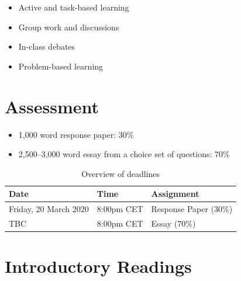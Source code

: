 \documentclass[abstract=on,parskip=full,headings=standardclasses,fontsize=11pt,paper=a4]{scrartcl}
\begin{document}
\begin{itemize}
\item Active and task-based learning
\item Group work and discussions
\item In-class debates
\item Problem-based learning
\end{itemize}

\section*{Assessment}

\begin{itemize}
\item 1,000 word response paper: 30\% 
\item 2,500--3,000 word essay from a choice set of questions: 70\%
\end{itemize}

\begin{table}[h] \centering \onehalfspacing
\caption*{Overview of deadlines}
\begin{tabular}{ l l l} 
\toprule
Date &  Time & Assignment \\
\midrule
Friday, 20 March 2020 & 8:00pm CET &  Response Paper (30\%)  \\
TBC  & 8:00pm CET  & Essay (70\%) \\
\bottomrule
\end{tabular}
\end{table}



\section*{Introductory Readings}
\end{document}
